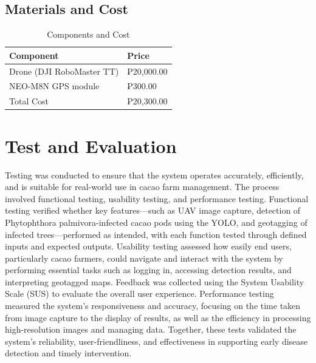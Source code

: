 \subsection{Materials and Cost}

\begin{table}[H]
	\centering
	\caption{Components and Cost}
	\label{tab:components}
	\begin{tabular}{ll}
		\toprule
		Component                 & Price      \\
		\midrule
		Drone (DJI RoboMaster TT) & ₱20,000.00 \\
		\midrule
		NEO-M8N GPS module        & ₱300.00    \\
		\midrule
		Total Cost                & ₱20,300.00 \\
		\bottomrule
	\end{tabular}
\end{table}

\section{Test and Evaluation}
Testing was conducted to ensure that the system operates accurately, efficiently, and is suitable for real-world use in cacao farm management. The process involved functional testing, usability testing, and performance testing. Functional testing verified whether key features—such as UAV image capture, detection of Phytophthora palmivora-infected cacao pods using the YOLO, and geotagging of infected trees—performed as intended, with each function tested through defined inputs and expected outputs. Usability testing assessed how easily end users, particularly cacao farmers, could navigate and interact with the system by performing essential tasks such as logging in, accessing detection results, and interpreting geotagged maps. Feedback was collected using the System Usability Scale (SUS) to evaluate the overall user experience. Performance testing measured the system’s responsiveness and accuracy, focusing on the time taken from image capture to the display of results, as well as the efficiency in processing high-resolution images and managing data. Together, these tests validated the system’s reliability, user-friendliness, and effectiveness in supporting early disease detection and timely intervention.

